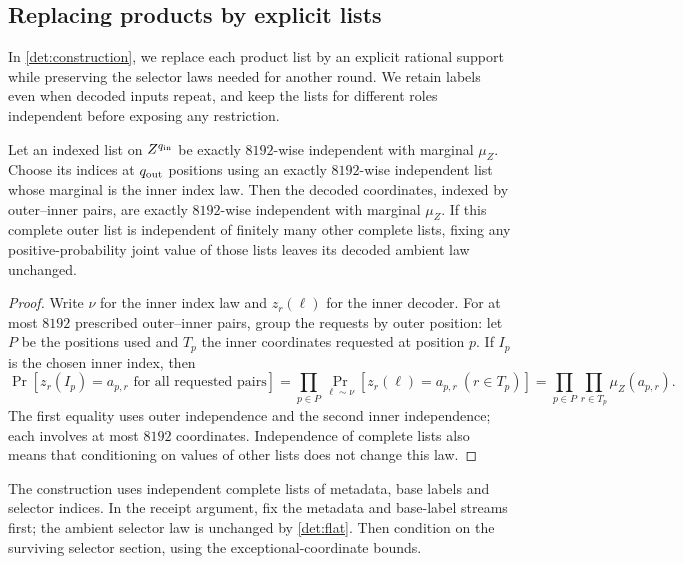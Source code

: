 \documentclass[11pt]{article} \usepackage[utf8]{inputenc}
\theoremstyle{plain} \newtheorem{theorem}{Theorem}[section]
\theoremstyle{definition} \newaliascnt{definition}{theorem}
\begin{document}
\subsection{Replacing products by explicit lists}

In \cref{det:construction}, we replace each product list by an explicit rational
support while preserving the selector laws needed for another round. We retain
labels even when decoded inputs repeat, and keep the lists for different roles
independent before exposing any restriction.

\begin{lemma}\label{det:flat}
Let an indexed list on \(Z^{q_{\rm in}}\) be exactly \(8192\)-wise independent
with marginal \(\mu_Z\). Choose its indices at \(q_{\rm out}\) positions using
an exactly \(8192\)-wise independent list whose marginal is the inner index law.
Then the decoded coordinates, indexed by outer--inner pairs, are exactly
\(8192\)-wise independent with marginal \(\mu_Z\). If this complete outer list
is independent of finitely many other complete lists, fixing any
positive-probability joint value of those lists leaves its decoded ambient law
unchanged.
\end{lemma}

\begin{proof}
Write $\nu$ for the inner index law and $z_r(\ell)$ for the inner decoder.
For at most $8192$ prescribed outer--inner pairs, group the requests by outer
position: let $P$ be the positions used and $T_p$ the inner coordinates requested
at position $p$. If $I_p$ is the chosen inner index, then
\[
\Pr[z_r(I_p)=a_{p,r}\text{ for all requested pairs}]
=\prod_{p\in P}\Pr_{\ell\sim\nu}[z_r(\ell)=a_{p,r}\ (r\in T_p)]
=\prod_{p\in P}\prod_{r\in T_p}\mu_Z(a_{p,r}).
\]
The first equality uses outer independence and the second inner independence;
each involves at most $8192$ coordinates. Independence of complete lists also
means that conditioning on values of other lists does not change this law.
\end{proof}

The construction uses independent complete lists of metadata, base labels and
selector indices. In the receipt argument, fix the metadata and base-label
streams first; the ambient selector law is unchanged by \cref{det:flat}.
Then condition on the surviving selector section, using the
exceptional-coordinate bounds.
\end{document}
